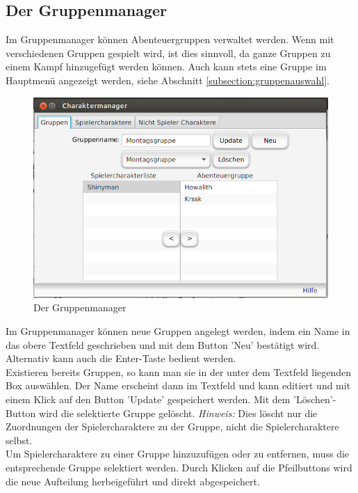 \documentclass[11pt, a4paper, german]{article}
\begin{document}
\subsection{Der Gruppenmanager}
Im Gruppenmanager können Abenteuergruppen verwaltet werden. Wenn mit verschiedenen Gruppen gespielt wird, ist dies sinnvoll, da ganze Gruppen zu einem Kampf hinzugefügt werden können. Auch kann stets eine Gruppe im Hauptmenü angezeigt werden, siehe Abschnitt \ref{subsection:gruppenauswahl}.\\
\begin{figure}
\centering
\includegraphics[width=1\linewidth]{Bilder/Gruppenmanager}
\caption{Der Gruppenmanager}
\label{fig:Gruppenmanager}
\end{figure}

Im Gruppenmanager können neue Gruppen angelegt werden, indem ein Name in das obere Textfeld geschrieben und mit dem Button 'Neu' bestätigt wird. Alternativ kann auch die Enter-Taste bedient werden.\\
Existieren bereits Gruppen, so kann man sie in der unter dem Textfeld liegenden Box auswählen. Der Name erscheint dann im Textfeld und kann editiert und mit einem Klick auf den Button 'Update' gespeichert werden. Mit dem 'Löschen'-Button wird die selektierte Gruppe gelöscht. \textit{Hinweis:} Dies löscht nur die Zuordnungen der Spielercharaktere zu der Gruppe, nicht die Spielercharaktere selbst.\\

Um Spielercharaktere zu einer Gruppe hinzuzufügen oder zu entfernen, muss die entsprechende Gruppe selektiert werden. Durch Klicken auf die Pfeilbuttons wird die neue Aufteilung herbeigeführt und direkt abgespeichert.
\end{document}
